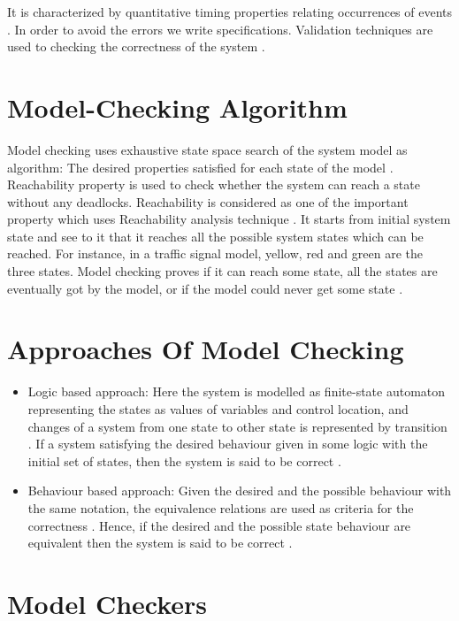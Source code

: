 \documentclass[a4paper,10pt]{report}
\begin{document}
It is characterized by quantitative timing properties relating occurrences of events \cite{Engler}.
In order to avoid the errors we write specifications. Validation techniques are used to checking the correctness of the system \cite{Wang2007}.  

\section{Model-Checking Algorithm}
\label{Model chec Algo}

Model checking uses exhaustive state space search of the system model as algorithm: The desired properties satisfied for each state of the model \cite{Berard}. Reachability property is used to check whether the system can reach a state without any deadlocks. Reachability is considered as one of the important property which uses Reachability analysis technique \cite{M.Davis1962}. It starts from initial system state and see to it that it reaches all the possible system states which can be reached. For instance, in a traffic signal model, yellow, red and green are the three states. Model checking proves if it can reach some state, all the states are eventually got by the model, or if the model could never get some state \cite{M.Davis1962}.

\section{Approaches Of Model Checking}
\label{Appr to model check}

\begin{itemize}
\item Logic based approach: Here the system is modelled as finite-state automaton representing the states as values of variables and control location, and changes of a system from one state to other state is represented by transition \cite{DanielJackson}. If a system satisfying the desired behaviour given in some logic with the initial set of states, then the system is said to be correct \cite{DanielJackson}.
\item Behaviour based approach: Given the desired and the possible behaviour with the same notation, the equivalence relations are used as criteria for the correctness \cite{DanielJackson}. Hence, if the desired and the possible state behaviour are equivalent then the system is said to be correct \cite{DanielJackson}.  
\end{itemize}

\section{Model Checkers}
\end{document}
